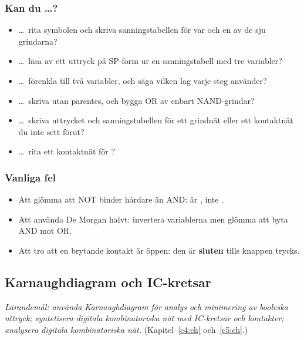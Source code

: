\subsubsection{Kan du \dots?}
\begin{itemize}
  \item \dots\ rita symbolen och skriva sanningstabellen för var och en av de sju grindarna?
  \item \dots\ läsa av ett uttryck på SP-form ur en sanningstabell med tre variabler?
  \item \dots\ förenkla  till två variabler, och säga vilken lag varje steg
    använder?
  \item \dots\ skriva  utan parentes, och bygga OR av enbart NAND-grindar?
  \item \dots\ skriva uttrycket och sanningstabellen för ett grindnät eller ett kontaktnät du inte
    sett förut?
  \item \dots\ rita ett kontaktnät för ?
\end{itemize}

\subsubsection{Vanliga fel}
\begin{itemize}
  \item Att glömma att NOT binder hårdare än AND:  är , inte .
  \item Att använda De Morgan halvt: invertera variablerna men glömma att byta AND mot OR.
  \item Att tro att en brytande kontakt är öppen: den är \textbf{sluten} tills knappen trycks.
\end{itemize}

\subsection{Karnaughdiagram och IC-kretsar}
\label{c12:a4}
\emph{Lärandemål: använda Karnaughdiagram för analys och minimering av booleska uttryck;
syntetisera digitala kombinatoriska nät med IC-kretsar och kontakter; analysera digitala
kombinatoriska nät.} (Kapitel~\ref{c4:ch} och~\ref{c5:ch}.)

